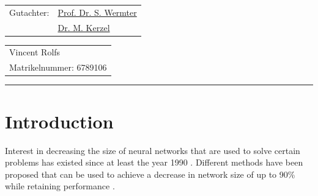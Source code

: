 \documentclass[12pt,final,twoside]{article}
\makeatletter
\newcommand{\trauthor}{Vincent Rolfs}
\newcommand{\trmatrikelnummer}{6789106}
\newcommand{\trgutachterA}{\href{mailto:wermter@informatik.uni-hamburg.de}{Prof. Dr. S. Wermter}}
\newcommand{\trgutachterB}{\href{mailto:matthias.kerzel@informatik.uni-hamburg.de}{Dr. M. Kerzel}}
\theoremstyle{plain}
\theoremstyle{definition}
\theoremstyle{remark}
\theoremstyle{named}
\makeatother
\begin{document}
\begin{titlepage}
    \vspace{1cm}
    \begin{center}
    \begin{tabular}{ll}
    Gutachter: & \trgutachterA \\
                   & \trgutachterB \\
    \end{tabular}
    \end{center}
    \vfill
    \begin{tabular}{l}
    \trauthor \\
    Matrikelnummer:  \trmatrikelnummer \\
    \end{tabular}
    \newline
    \rule{\textwidth}{0.4pt}
    \newpage 
\end{titlepage}


\tableofcontents
\newpage

\fancyhead[LE]{\it \rightmark}           %
\fancyhead[RO]{\it \rightmark}          %
\fancyhead[LO,RE]{}                     %


\section{Introduction}
Interest in decreasing the size of neural networks that are used to solve certain problems has existed since at least the year 1990 \cite{braindamage}. Different methods have been proposed that can be used to achieve a decrease in network size of up to 90\% while retaining performance \cite{braindamage} \cite{learning-weights-connections} \cite{brainsurgeon} \cite{pruning-filters}.
\end{document}
